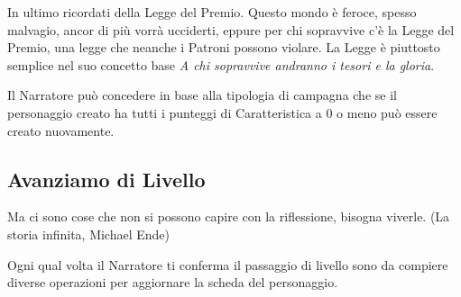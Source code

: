 \begin{multicols}{2}
In ultimo ricordati della Legge del Premio. Questo mondo è feroce, spesso malvagio, ancor di più vorrà ucciderti, eppure per chi sopravvive c'è la Legge del Premio, una legge che neanche i Patroni possono violare. La Legge è piuttosto semplice nel suo concetto base \emph{A chi sopravvive andranno i tesori e la gloria}.

\begin{narratore}
Il Narratore può concedere in base alla tipologia di campagna che se il personaggio creato ha tutti i punteggi di Caratteristica a 0 o meno può essere creato nuovamente.
\end{narratore}

\subsection{Avanziamo di Livello}\label{avanzamentodilivello}

\begin{enfasi}{
Ma ci sono cose che non si possono capire con la riflessione, bisogna viverle. (La storia infinita, Michael Ende)
}\end{enfasi}

Ogni qual volta il Narratore ti conferma il passaggio di livello sono da compiere diverse operazioni per aggiornare la scheda del personaggio.


\end{multicols}
